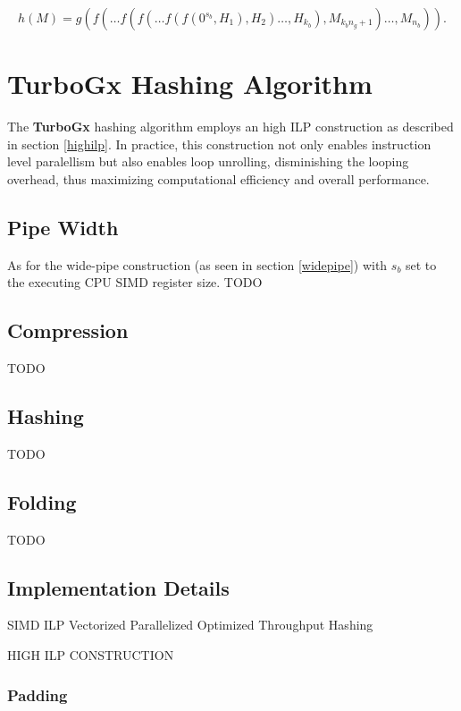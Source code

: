\documentclass[11pt]{article}
\begin{document}
\begin{equation*}
h(M) = g\left( f( \ldots f(f(\ldots f(f(0^{s_b}, H_1), H_2) \ldots, H_{k_b}), M_{{k_b}{n_g}+1}) \ldots, M_{n_b} ) \right).
\end{equation*}

\section{TurboGx Hashing Algorithm}

The \textbf{TurboGx} hashing algorithm employs an high ILP construction as described in section \ref{highilp}. In practice, this construction not only enables instruction level paralellism but also enables loop unrolling, disminishing the looping overhead, thus maximizing computational efficiency and overall performance. 

\subsection{Pipe Width}
As for the wide-pipe construction (as seen in section \ref{widepipe}) with \( s_b \) set to the executing CPU SIMD register size.
TODO

\subsection{Compression}

TODO

\subsection{Hashing}

TODO

\subsection{Folding}

TODO

\subsection{Implementation Details}

SIMD
ILP
Vectorized
Parallelized
Optimized
Throughput
Hashing

HIGH ILP CONSTRUCTION

\subsubsection{Padding}
\end{document}
